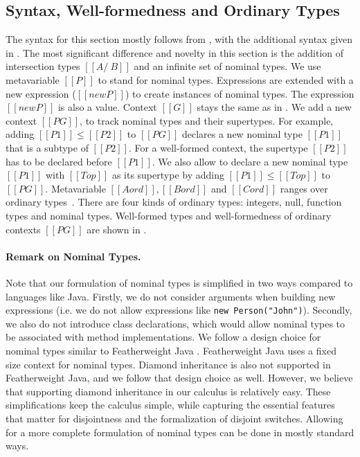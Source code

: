 \subsection{Syntax, Well-formedness and Ordinary Types}
\label{sec:inter:system}
The syntax for this section mostly follows
from , with the additional syntax given in
.
The most significant difference and novelty in this section
is the addition of intersection types $[[A/\ B]]$ and
an infinite set of nominal types. We use metavariable $[[P]]$ to stand for
nominal types.
Expressions are extended with
a new expression ($[[new P]]$) to create instances of nominal
types.  The expression $[[new P]]$ is also a value.
Context $[[G]]$ stays the same as in .
We add a new context $[[PG]]$, to track nominal types and their supertypes.
For example, adding $[[P1]] \leq [[P2]]$ to $[[PG]]$ declares a new
nominal type $[[P1]]$ that is a subtype of $[[P2]]$.
For a well-formed context, the supertype $[[P2]]$ has to be declared before
$[[P1]]$. We also allow to declare a new nominal type $[[P1]]$
with $[[Top]]$ as
its supertype by adding $[[P1]] \leq [[Top]]$ to $[[PG]]$.
Metavariable $[[Aord]], [[Bord]]$ and $[[Cord]]$ ranges
over ordinary types~\citep{davies2000intersection}.
There are four kinds of ordinary types: integers, null, function types and nominal types.
Well-formed types and well-formedness of ordinary contexts $[[PG]]$
are shown in .

\paragraph*{Remark on Nominal Types.}
Note that our
formulation of nominal types is simplified in two ways compared to
languages like Java.
Firstly, we do not consider arguments when
building new expressions (i.e. we do not allow expressions like
\lstinline{new Person("John")}).  Secondly, we also do not introduce
class declarations, which would allow nominal types to be associated
with method implementations. We follow a design choice for
nominal types similar to Featherweight Java
\citep{DBLP:journals/toplas/IgarashiPW01}.
Featherweight Java uses a fixed size context for nominal types.
Diamond inheritance is also not supported in Featherweight Java, and we follow
that design choice as well.
However, we believe that supporting diamond inheritance in our
calculus is relatively easy.
These simplifications keep the calculus
simple, while capturing the essential features that matter
for disjointness and the formalization of disjoint switches.
Allowing for a more complete formulation of nominal types
can be done in mostly standard ways.

